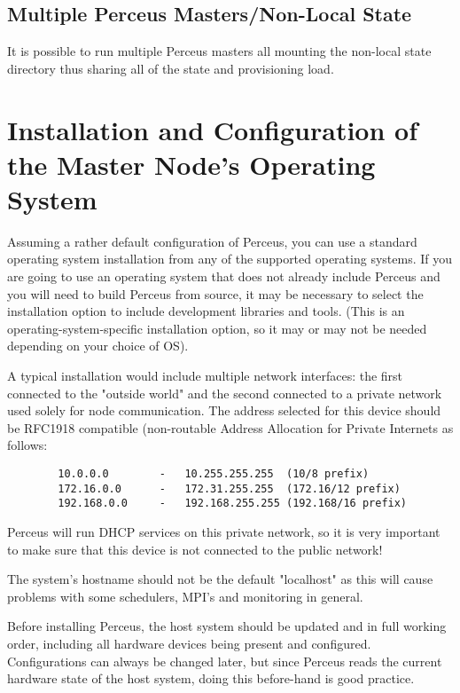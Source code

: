 \documentclass[10pt,letterpaper]{report}
\begin{document}
\subsection{Multiple Perceus Masters/Non-Local State}
It is possible to run multiple Perceus masters all mounting the non-local state
directory thus sharing all of the state and provisioning load.


\section{Installation and Configuration of the Master Node's Operating System}

Assuming a rather default configuration of Perceus, you can use a standard
operating system installation from any of the supported operating systems. If
you are going to use an operating system that does not already include Perceus
and you will need to build Perceus from source, it may be necessary to select
the installation option to include development libraries and tools.  (This is
an operating-system-specific installation option, so it may or may not be
needed depending on your choice of OS).

A typical installation would include multiple network interfaces: the first
connected to the "outside world" and the second connected to a private network
used solely for node communication. The address selected for this device
should be RFC1918 compatible (non-routable Address Allocation for Private
Internets as follows:

\begin{verbatim}
        10.0.0.0        -   10.255.255.255  (10/8 prefix)
        172.16.0.0      -   172.31.255.255  (172.16/12 prefix)
        192.168.0.0     -   192.168.255.255 (192.168/16 prefix)
\end{verbatim}


Perceus will run DHCP services on this private network, so it is very
important to make sure that this device is not connected to the public
network!

The system's hostname should not be the default "localhost" as this will cause
problems with some schedulers, MPI's and monitoring in general.

Before installing Perceus, the host system should be updated and in full
working order, including all hardware devices being present and configured.
Configurations can always be changed later, but since Perceus reads the
current hardware state of the host system, doing this before-hand is good
practice.
\end{document}
